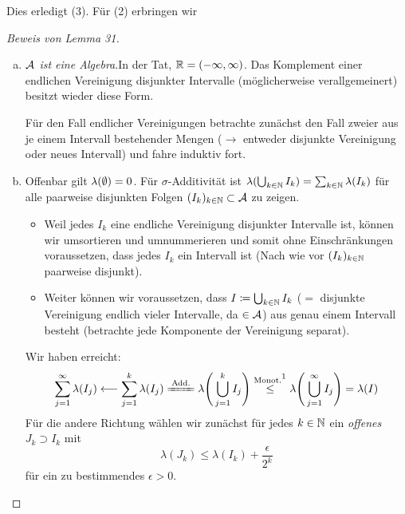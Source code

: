 \documentclass[skript.tex]{subfiles}
\begin{document}
		Dies erledigt (3). Für (2) erbringen wir
		\begin{proof}[Beweis von Lemma 31]
			\hfill %
			\begin{enumerate}[(a)]
				\item \emph{$\mathcal{A}$ ist eine Algebra}.\quad In der Tat, $\mathbb{R} = (-\infty,\infty)$.
					Das Komplement einer endlichen Vereinigung disjunkter Intervalle
					(möglicherweise verallgemeinert) besitzt wieder diese Form.
					
					Für den Fall endlicher Vereinigungen betrachte zunächst den Fall zweier aus je
					einem Intervall bestehender Mengen ($\rightarrow$ entweder disjunkte
					Vereinigung oder neues Intervall) und fahre induktiv fort.
				\item Offenbar gilt $\lambda(\emptyset) = 0$. Für $\sigma$-Additivität ist
					$\lambda(\bigcup_{k\in\mathbb{N}} I_k) = \sum_{k\in\mathbb{N}} \lambda(I_k)$ für alle paarweise
					disjunkten Folgen $(I_k)_{k\in\mathbb{N}} \subset \mathcal{A}$ zu zeigen.
					
					\begin{itemize}
						\item Weil jedes $I_k$ eine endliche Vereinigung disjunkter Intervalle ist,
							können wir umsortieren und umnummerieren und somit ohne
							Einschränkungen voraussetzen, dass jedes $I_k$ ein Intervall ist
							(Nach wie vor $(I_k)_{k\in\mathbb{N}}$ paarweise disjunkt).
						\item Weiter können wir voraussetzen, dass $I \coloneqq \bigcup_{k\in\mathbb{N}} I_k$
							($=$ disjunkte Vereinigung endlich vieler Intervalle, da $\in \mathcal{A}$)
							aus genau einem Intervall besteht (betrachte jede Komponente der
							Vereinigung separat).
					\end{itemize}
					Wir haben erreicht:
					\[
						\sum_{j=1}^\infty \lambda(I_j) \longleftarrow \sum_{j=1}^k \lambda(I_j)
						\xlongequal{\text{Add.}} \lambda{\Bigg( \bigcup_{j=1}^k I_j \Bigg)}
						\overset{\text{Monot.}\footnotemark}{\leq}
						\lambda{\Bigg( \bigcup_{j=1}^\infty I_j \Bigg)} = \lambda(I)
					\]
					Für die andere Richtung wählen wir zunächst für jedes $k\in\mathbb{N}$ ein 
					\emph{offenes} $J_k \supset I_k$ mit
					\[
						\lambda(J_k) \leq \lambda(I_k) + \frac{\epsilon}{2^k}
					\]
					für ein zu bestimmendes $\epsilon > 0$.
					

\end{enumerate}
\end{proof}
\end{document}
